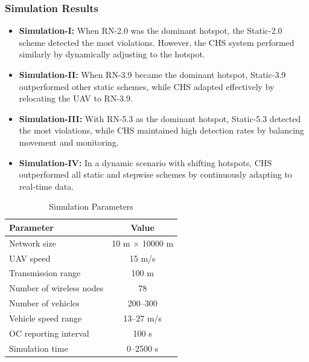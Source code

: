 \subsubsection{Simulation Results}
\begin{itemize}
    \item \textbf{Simulation-I:} When RN-2.0 was the dominant hotspot, the Static-2.0 scheme detected the most violations. However, the CHS system performed similarly by dynamically adjusting to the hotspot.
    \item \textbf{Simulation-II:} When RN-3.9 became the dominant hotspot, Static-3.9 outperformed other static schemes, while CHS adapted effectively by relocating the UAV to RN-3.9.
    \item \textbf{Simulation-III:} With RN-5.3 as the dominant hotspot, Static-5.3 detected the most violations, while CHS maintained high detection rates by balancing movement and monitoring.
    \item \textbf{Simulation-IV:} In a dynamic scenario with shifting hotspots, CHS outperformed all static and stepwise schemes by continuously adapting to real-time data.
\end{itemize}

\begin{table}[h]
    \centering
    \caption{Simulation Parameters}
    \label{tab:simulation_params}
    \begin{tabular}{|l|c|}
        \hline
        \textbf{Parameter} & \textbf{Value} \\
        \hline
        Network size & 10 m \(\times\) 10000 m \\
        UAV speed & 15 m/s \\
        Transmission range & 100 m \\
        Number of wireless nodes & 78 \\
        Number of vehicles & 200–300 \\
        Vehicle speed range & 13–27 m/s \\
        OC reporting interval & 100 s \\
        Simulation time & 0–2500 s \\
        \hline
    \end{tabular}
\end{table}

\vspace{\baselineskip} %

